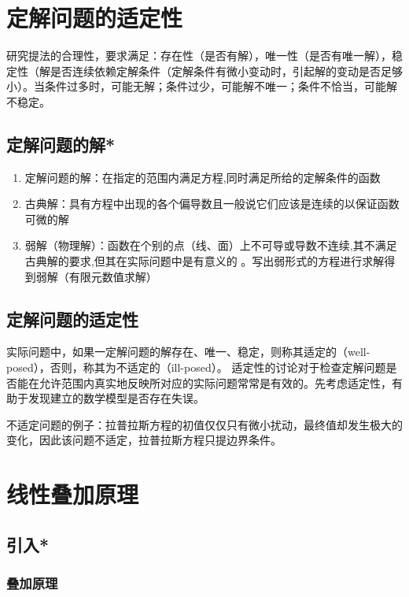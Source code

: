 \section{定解问题的适定性}

研究提法的合理性，要求满足：存在性（是否有解），唯一性（是否有唯一解），稳定性（解是否连续依赖定解条件（定解条件有微小变动时，引起解的变动是否足够小）。当条件过多时，可能无解；条件过少，可能解不唯一；条件不恰当，可能解不稳定。

\subsection{定解问题的解*}
\begin{enumerate}
	\item 定解问题的解：在指定的范围内满足方程,同时满足所给的定解条件的函数
	\item 古典解：具有方程中出现的各个偏导数且一般说它们应该是连续的以保证函数可微的解
	\item 弱解（物理解）：函数在个别的点（线、面）上不可导或导数不连续,其不满足古典解的要求,但其在实际问题中是有意义的 。写出弱形式的方程进行求解得到弱解（有限元数值求解）
\end{enumerate}

\subsection{定解问题的适定性}

实际问题中，如果一定解问题的解存在、唯一、稳定，则称其适定的（well-posed），否则，称其为不适定的（ill-posed）。	适定性的讨论对于检查定解问题是否能在允许范围内真实地反映所对应的实际问题常常是有效的。先考虑适定性，有助于发现建立的数学模型是否存在失误。

不适定问题的例子：拉普拉斯方程的初值仅仅只有微小扰动，最终值却发生极大的变化，因此该问题不适定，拉普拉斯方程只提边界条件。

\section{线性叠加原理}

\subsection{引入*}

\subsubsection{叠加原理}

